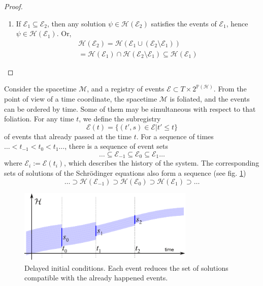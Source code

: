 \documentclass[11pt]{amsart}
\theoremstyle{definition}
\theoremstyle{plain}
\begin{document}
\begin{proof}
\begin{enumerate}
	\item 
If $\mathcal E_1\subseteq \mathcal E_2$, then any solution $\psi\in\mathscr{H}(\mathcal E_2)$ satisfies the events of $\mathcal E_1$, hence $\psi\in\mathscr{H}(\mathcal E_1)$.
Or,
\begin{equation}
\begin{array}{l}
\mathscr{H}(\mathcal E_2) = \mathscr{H}\left(\mathcal E_1\cup (\mathcal E_2\setminus \mathcal E_1)\right) \\
= \mathscr{H}(\mathcal E_1)\cap \mathscr{H}\left(\mathcal E_2\setminus \mathcal E_1\right) \subseteq \mathscr{H}(\mathcal E_1)
\end{array}
\end{equation}
\end{enumerate}
\end{proof}

Consider the spacetime $\mathcal M$, and a registry of events $\mathcal E\subset T\times 2^{\mathbb P(\mathcal{H})}$. From the point of view of a time coordinate, the spacetime $\mathcal M$ is foliated, and the events can be ordered by time. Some of them may be simultaneous with respect to that foliation. For any time $t$, we define the subregistry
\begin{equation}
\mathcal E(t)=\{(t',s)\in\mathcal E|t'\leq t\}
\end{equation}
of events that already passed at the time $t$. For a sequence of times $\ldots < t_{-1} < t_0 < t_1 \ldots$, there is a sequence of event sets
\begin{equation}
\ldots \subseteq \mathcal E_{-1} \subseteq \mathcal E_0 \subseteq \mathcal E_1 \ldots
\end{equation}
where $\mathcal E_i:=\mathcal E(t_i)$, which describes the history of the system. The corresponding sets of solutions of the Schr\"odinger equations also form a sequence (see fig. \ref{Fig1})
\begin{equation}
\ldots \supset \mathscr{H}(\mathcal E_{-1}) \supset \mathscr{H}(\mathcal E_0) \supset \mathscr{H}(\mathcal E_1) \supset \ldots
\end{equation}

\begin{figure}[t!]
\centering
\includegraphics[width=84mm]{Fig1}
\caption{\label{Fig1}Delayed initial conditions. Each event reduces the set of solutions compatible with the already happened events.}
\end{figure}
\end{document}
